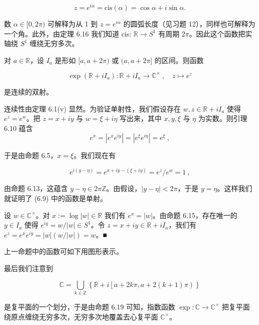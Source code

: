 \[
z=e^{i\alpha}=\mathrm{c i s}(\alpha)=\cos\alpha+i\sin\alpha.
\]

数 $ \alpha \in [0, 2\pi) $ 可解释为从 1 到 $ z = e^{i\alpha} $ 的圆弧长度（见习题 12），同样也可解释为一个角。此外，由定理 6.16 我们知道 cis: $ \mathbb{R} \to S^1 $ 有周期 $ 2\pi $。因此这个函数把实轴绕 $ S^1 $ 缠绕无穷多次。

\begin{proposition}

对 $ a \in \mathbb{R} $，设 $ I_a $ 是形如 $ [a, a + 2\pi) $ 或 $ (a, a + 2\pi] $ 的区间。则函数

\begin{equation}
\exp(\mathbb{R}+i I_{a}):\mathbb{R}+i I_{a}\to\mathbb{C}^{\times}~,\quad z\mapsto e^{z}
\end{equation}

是连续的双射。

\proofhead
连续性由定理 6.1(v) 显然。为验证单射性，我们假设存在 $w, z \in \mathbb{R} + iI_a$ 使得 $e^z = e^w$。把 $z = x + iy$ 与 $w = \xi + i\eta$ 写出来，其中 $x, y, \xi$ 与 $\eta$ 为实数。则引理 6.10 蕴含
\begin{equation}
e^{x}=|e^{x}e^{iy}|=|e^{\xi}e^{i\eta}|=e^{\xi}~,
\end{equation}

于是由命题 6.5，$ x=\xi $。我们现在有

\[
e^{i(y-\eta)}=e^{x+i y-(\xi+i y)}=e^{z}/e^{w}=1~,
\]

由命题 6.13，这蕴含 $ y - \eta \in 2\pi\mathbb{Z} $。由假设，$ |y - \eta| < 2\pi $，于是 $ y = \eta $。这样我们就证明了 (6.9) 中的函数是单射。

设 $ w \in \mathbb{C}^\times $。对 $ x := \log|w| \in \mathbb{R} $ 我们有 $ e^x = |w| $。由命题 6.15，存在唯一的 $ y \in I_a $ 使得 $ e^{iy} = w/|w| \in S^1 $。令 $ z = x + iy \in \mathbb{R} + iI_a $，我们有 $ e^z = e^xe^{iy} = |w|(w/|w|) = w $。■

\end{proposition}

上一命题中的函数可如下用图形表示。


最后我们注意到

\[
\mathbb{C}=\bigcup_{k\in\mathbb{Z}}\left\{\mathbb{R}+i\left[a+2k\pi,a+2(k+1)\pi\right)\right\}
\]

是复平面的一个划分，于是由命题 6.19 可知，指数函数 $ \exp: \mathbb{C} \to \mathbb{C}^\times $ 把复平面绕原点缠绕无穷多次，无穷多次地覆盖去心复平面 $ \mathbb{C}^\times $。


